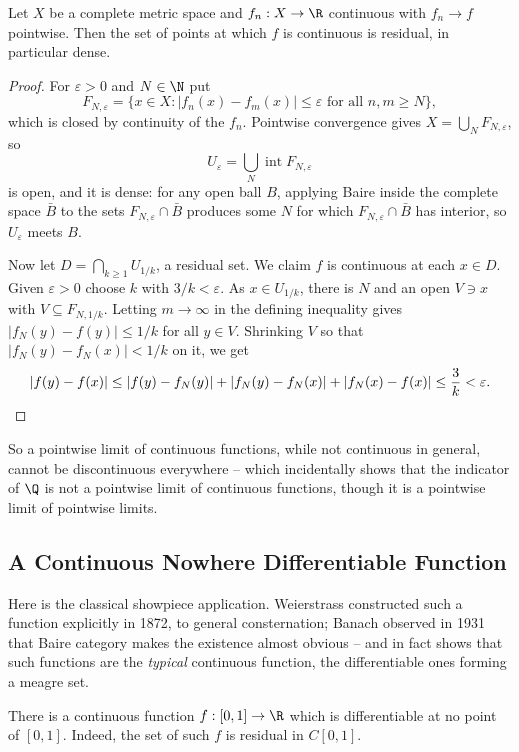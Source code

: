 \begin{theorem}[Osgood]
	Let $X$ be a complete metric space and $f_n : X \to \R$ continuous with $f_n \to f$ pointwise. Then the set of points at which $f$ is continuous is residual, in particular dense.
\end{theorem}

\begin{proof}
	For $\varepsilon>0$ and $N \in \N$ put
	$$F_{N,\varepsilon} = \{ x \in X : |f_n(x)-f_m(x)|\leq\varepsilon \text{ for all } n,m\geq N\},$$
	which is closed by continuity of the $f_n$. Pointwise convergence gives $X = \bigcup_N F_{N,\varepsilon}$, so
	$$U_\varepsilon = \bigcup_N \operatorname{int} F_{N,\varepsilon}$$
	is open, and it is dense: for any open ball $B$, applying Baire inside the complete space $\bar B$ to the sets $F_{N,\varepsilon}\cap\bar B$ produces some $N$ for which $F_{N,\varepsilon}\cap\bar B$ has interior, so $U_\varepsilon$ meets $B$.

	Now let $D = \bigcap_{k\geq1}U_{1/k}$, a residual set. We claim $f$ is continuous at each $x \in D$. Given $\varepsilon>0$ choose $k$ with $3/k<\varepsilon$. As $x \in U_{1/k}$, there is $N$ and an open $V \ni x$ with $V \subseteq F_{N,1/k}$. Letting $m \to\infty$ in the defining inequality gives $|f_N(y)-f(y)|\leq 1/k$ for all $y \in V$. Shrinking $V$ so that $|f_N(y)-f_N(x)|<1/k$ on it, we get
	$$|f(y)-f(x)| \leq |f(y)-f_N(y)|+|f_N(y)-f_N(x)|+|f_N(x)-f(x)| \leq \frac{3}{k}<\varepsilon. \qedhere$$
\end{proof}

So a pointwise limit of continuous functions, while not continuous in general, cannot be discontinuous everywhere -- which incidentally shows that the indicator of $\Q$ is not a pointwise limit of continuous functions, though it is a pointwise limit of pointwise limits.

\subsection{A Continuous Nowhere Differentiable Function}

Here is the classical showpiece application. Weierstrass constructed such a function explicitly in 1872, to general consternation; Banach observed in 1931 that Baire category makes the existence almost obvious -- and in fact shows that such functions are the \emph{typical} continuous function, the differentiable ones forming a meagre set.

\begin{theorem}
	There is a continuous function $f : [0,1] \to \R$ which is differentiable at no point of $[0,1]$. Indeed, the set of such $f$ is residual in $C[0,1]$.
\end{theorem}

